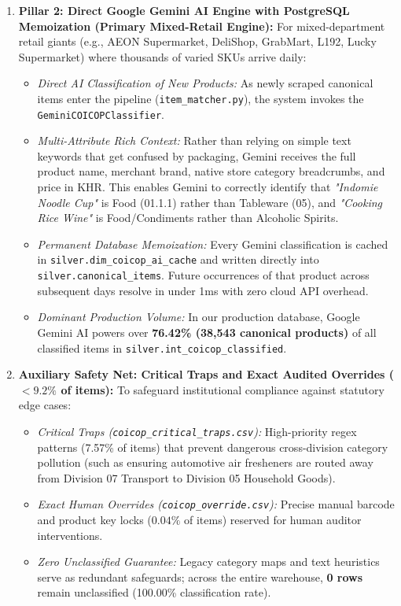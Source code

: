 \documentclass[11pt,a4paper,oneside]{article}
\begin{document}
\begin{enumerate}
    \item \textbf{Pillar 2: Direct Google Gemini AI Engine with PostgreSQL Memoization (Primary Mixed-Retail Engine):}
    For mixed-department retail giants (e.g., AEON Supermarket, DeliShop, GrabMart, L192, Lucky Supermarket) where thousands of varied SKUs arrive daily:
    \begin{itemize}[noitemsep]
        \item \textit{Direct AI Classification of New Products:} As newly scraped canonical items enter the pipeline (\texttt{item\_matcher.py}), the system invokes the \texttt{GeminiCOICOPClassifier}.
        \item \textit{Multi-Attribute Rich Context:} Rather than relying on simple text keywords that get confused by packaging, Gemini receives the full product name, merchant brand, native store category breadcrumbs, and price in KHR. This enables Gemini to correctly identify that \textit{"Indomie Noodle Cup"} is Food (01.1.1) rather than Tableware (05), and \textit{"Cooking Rice Wine"} is Food/Condiments rather than Alcoholic Spirits.
        \item \textit{Permanent Database Memoization:} Every Gemini classification is cached in \texttt{silver.dim\_coicop\_ai\_cache} and written directly into \texttt{silver.canonical\_items}. Future occurrences of that product across subsequent days resolve in under 1ms with zero cloud API overhead.
        \item \textit{Dominant Production Volume:} In our production database, Google Gemini AI powers over \textbf{76.42\% (38,543 canonical products)} of all classified items in \texttt{silver.int\_coicop\_classified}.
    \end{itemize}

    \item \textbf{Auxiliary Safety Net: Critical Traps and Exact Audited Overrides ($< 9.2\%$ of items):}
    To safeguard institutional compliance against statutory edge cases:
    \begin{itemize}[noitemsep]
        \item \textit{Critical Traps (\texttt{coicop\_critical\_traps.csv}):} High-priority regex patterns (7.57\% of items) that prevent dangerous cross-division category pollution (such as ensuring automotive air fresheners are routed away from Division 07 Transport to Division 05 Household Goods).
        \item \textit{Exact Human Overrides (\texttt{coicop\_override.csv}):} Precise manual barcode and product key locks ($0.04\%$ of items) reserved for human auditor interventions.
        \item \textit{Zero Unclassified Guarantee:} Legacy category maps and text heuristics serve as redundant safeguards; across the entire warehouse, \textbf{0 rows} remain unclassified (100.00\% classification rate).
    \end{itemize}
\end{enumerate}
\end{document}
